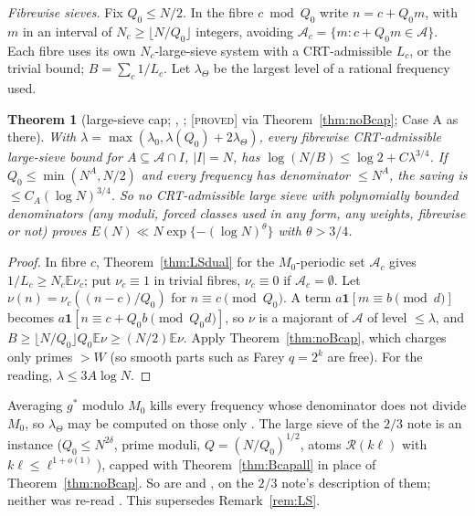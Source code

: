 \documentclass[10pt,reqno]{amsart}
\newtheorem{theorem}{Theorem}[section]
\theoremstyle{definition}
\theoremstyle{remark}
\newcommand{\A}{\mathcal A}
\newcommand{\cR}{\mathscr R}
\newcommand{\E}{\mathbb E}
\newcommand{\ind}{\mathbf 1}
\newcommand{\lab}[1]{\textup{[\textsc{#1}]}}
\begin{document}
\emph{Fibrewise sieves.}  Fix $Q_0\leq N/2$.  In the fibre $c\bmod Q_0$ write
$n=c+Q_0m$, with $m$ in an interval of $N_c\geq\lfloor N/Q_0\rfloor$ integers,
avoiding $\A_c=\{m:c+Q_0m\in\A\}$.  Each fibre uses its own
$N_c$-large-sieve system with a CRT-admissible $L_c$, or the trivial bound;
$B=\sum_c1/L_c$.  Let $\lambda_\Theta$ be the largest level of a rational
frequency used.

\begin{theorem}[large-sieve cap; {\cite[Thm~3.1, Cor.~3.2]{LS}}, {\cite[\S4.3]{KA3}}; \lab{proved} via Theorem~\ref{thm:noBcap}; Case A as there]\label{thm:LScap}
With $\lambda=\max(\lambda_0,\lambda(Q_0)+2\lambda_\Theta)$, every fibrewise CRT-admissible
large-sieve bound for $A\subseteq\A\cap I$, $|I|=N$, has
$\log(N/B)\leq\log2+C\lambda^{3/4}$.  If $Q_0\leq\min(N^A,N/2)$ and every
frequency has denominator $\leq N^A$, the saving is $\leq C_A(\log N)^{3/4}$.
So no CRT-admissible large sieve with polynomially bounded denominators
(any moduli, forced classes used in any form, any weights, fibrewise or
not) proves $E(N)\ll N\exp\{-(\log N)^\theta\}$ with $\theta>3/4$.
\end{theorem}
\begin{proof}
In fibre $c$, Theorem~\ref{thm:LSdual} for the $M_0$-periodic set $\A_c$ gives
$1/L_c\geq N_c\E\nu_c$; put $\nu_c\equiv1$ in trivial fibres, $\nu_c\equiv0$ if
$\A_c=\emptyset$.  Let $\nu(n)=\nu_c((n-c)/Q_0)$ for $n\equiv c\pmod{Q_0}$.  A term
$a\ind[m\equiv b\pmod d]$ becomes $a\ind[n\equiv c+Q_0b\pmod{Q_0d}]$, so $\nu$ is a
majorant of $\A$ of level $\leq\lambda$, and
$B\geq\lfloor N/Q_0\rfloor Q_0\E\nu\geq(N/2)\E\nu$.  Apply Theorem~\ref{thm:noBcap}, which
charges only primes $>W$ (so smooth parts such as Farey $q=2^k$ are free).
For the reading, $\lambda\leq3A\log N$.
\end{proof}
Averaging $g^*$ modulo $M_0$ kills every frequency whose denominator does
not divide $M_0$, so $\lambda_\Theta$ may be computed on those only
\cite[Rem.~3.3]{LS}.  The large sieve of the $2/3$ note \cite{LL} is an
instance ($Q_0\leq N^{2\delta}$, prime moduli, $Q=(N/Q_0)^{1/2}$, atoms $\cR(k\ell)$
with $k\ell\leq\ell^{1+o(1)}$), capped with Theorem~\ref{thm:Bcapall} in place of
Theorem~\ref{thm:noBcap}.  So are \cite{Vaughan} and \cite[\S4]{PW}, on the
$2/3$ note's description of them; neither was re-read \cite[Rem.~3.4]{LS}.
This supersedes Remark~\ref{rem:LS}.
\end{document}

